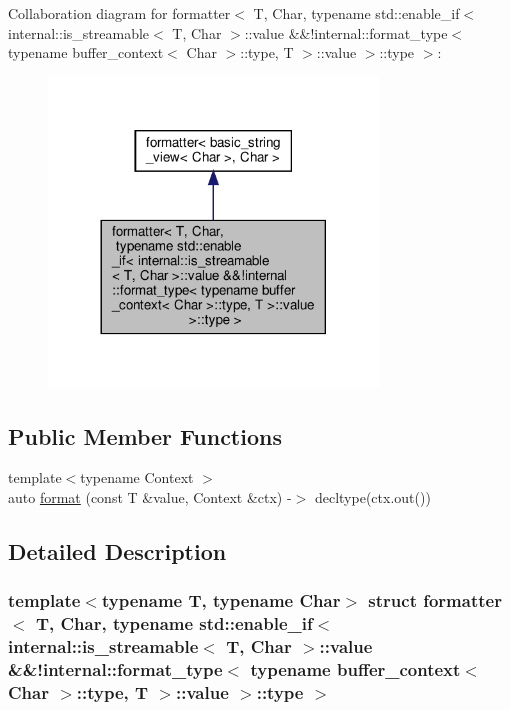 Collaboration diagram for formatter$<$ T, Char, typename std\+:\+:enable\+\_\+if$<$ internal\+:\+:is\+\_\+streamable$<$ T, Char $>$\+:\+:value \&\&!internal\+:\+:format\+\_\+type$<$ typename buffer\+\_\+context$<$ Char $>$\+:\+:type, T $>$\+:\+:value $>$\+:\+:type $>$\+:
\nopagebreak
\begin{figure}[H]
\begin{center}
\leavevmode
\includegraphics[width=248pt]{structformatter_3_01_t_00_01_char_00_01typename_01std_1_1enable__if_3_01internal_1_1is__streamab492173b5c38950e8f26682ba823a0221}
\end{center}
\end{figure}
\subsection*{Public Member Functions}
\begin{DoxyCompactItemize}
\item 
{\footnotesize template$<$typename Context $>$ }\\auto \hyperlink{structformatter_3_01_t_00_01_char_00_01typename_01std_1_1enable__if_3_01internal_1_1is__streamabdfe791f5d6e0a8acd43f884d0761b8af_ae9b195822bae194b4006b061c16eaa0a}{format} (const T \&value, Context \&ctx) -\/$>$ decltype(ctx.\+out())
\end{DoxyCompactItemize}


\subsection{Detailed Description}
\subsubsection*{template$<$typename T, typename Char$>$\newline
struct formatter$<$ T, Char, typename std\+::enable\+\_\+if$<$ internal\+::is\+\_\+streamable$<$ T, Char $>$\+::value \&\&!internal\+::format\+\_\+type$<$ typename buffer\+\_\+context$<$ Char $>$\+::type, T $>$\+::value $>$\+::type $>$}



